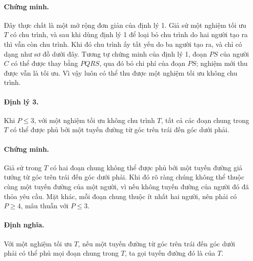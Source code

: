 \documentclass[11pt]{article}
\begin{document}
\paragraph{Chứng minh.}
Đây thực chất là một mở rộng đơn giản của định lý 1. Giả sử một nghiệm tối ưu
$T$ có chu trình, và sau khi dùng định lý 1 để loại bỏ chu trình do hai người
tạo ra thì vẫn còn chu trình. Khi đó chu trình ấy tất yếu do ba người tạo ra,
và chỉ có dạng như sơ đồ dưới đây. Tương tự chứng minh của định lý 1, đoạn
$PS$ của người $C$ có thể được thay bằng $PQRS$, qua đó bỏ chi phí của đoạn
$PS$; nghiệm mới thu được vẫn là tối ưu. Vì vậy luôn có thể thu được một
nghiệm tối ưu không chu trình.

\begin{center}
\end{center}

\paragraph{Định lý 3.}
Khi $P\le 3$, với một nghiệm tối ưu không chu trình $T$, tất cả các đoạn chung
trong $T$ có thể được phủ bởi một tuyến đường từ góc trên trái đến góc dưới
phải.

\paragraph{Chứng minh.}
Giả sử trong $T$ có hai đoạn chung không thể được phủ bởi một tuyến đường giả
tưởng từ góc trên trái đến góc dưới phải. Khi đó rõ ràng chúng không thể
thuộc cùng một tuyến đường của một người, vì nếu không tuyến đường của người
đó đã thỏa yêu cầu. Mặt khác, mỗi đoạn chung thuộc ít nhất hai người, nên
phải có $P\ge 4$, mâu thuẫn với $P\le 3$.

\paragraph{Định nghĩa.}
Với một nghiệm tối ưu $T$, nếu một tuyến đường từ góc trên trái đến góc dưới
phải có thể phủ mọi đoạn chung trong $T$, ta gọi tuyến đường đó là
 của $T$.
\end{document}
